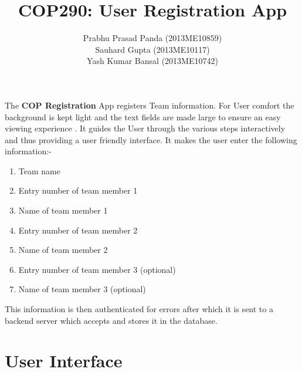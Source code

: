 \documentclass[12pt]{article}
\title{COP290: User Registration App}
\author{Prabhu Prasad Panda (2013ME10859) \\ 
Sauhard Gupta (2013ME10117) \\ 
Yash Kumar Bansal (2013ME10742) }
\begin{document}
\maketitle
   The \textbf{COP Registration} App registers Team information. For User comfort the background is kept light and the text fields are made large to ensure an easy viewing experience . It guides the User through the various steps interactively and thus providing a user friendly interface. It makes the user enter the following information:-
   \begin{enumerate}
\item Team name
\item Entry number of team member 1
\item Name of team member 1
\item Entry number of team member 2
\item Name of team member 2
\item Entry number of team member 3 (optional)
\item Name of team member 3 (optional)
\end{enumerate}
This information is then authenticated for errors after which it is sent to a backend server which accepts and stores it in the database.


\section{User Interface}
\end{document}
